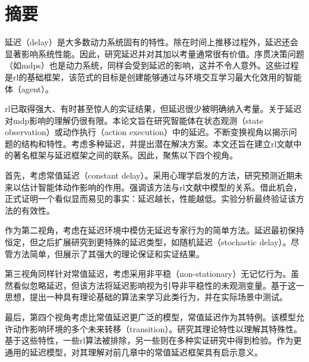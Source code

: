 \chapter*{摘要}

延迟（delay）是大多数动力系统固有的特性。除在时间上推移过程外，延迟还会显著影响系统性能。因此，研究延迟并对其加以考量通常很有价值。序贯决策问题（如\glspl{mdp}）也是动力系统，同样会受到延迟的影响，这并不令人意外。这些过程是\gls{rl}的基础框架，该范式的目标是创建能够通过与环境交互学习最大化效用的智能体（agent）。

\gls{rl}已取得强大、有时甚至惊人的实证结果，但延迟很少被明确纳入考量。关于延迟对\gls{mdp}影响的理解仍很有限。本论文旨在研究智能体在状态观测（state observation）或动作执行（action execution）中的延迟。不断变换视角以揭示问题的结构和特性。考虑多种延迟，并提出潜在解决方案。本文还旨在建立\gls{rl}文献中的著名框架与延迟框架之间的联系。因此，聚焦以下四个视角。

首先，考虑常值延迟（constant delay）。采用心理学启发的方法，研究预测近期未来以估计智能体动作影响的作用。强调该方法与\gls{rl}文献中模型的关系。借此机会，正式证明一个看似显而易见的事实：延迟越长，性能越低。实验分析最终验证该方法的有效性。

作为第二视角，考虑在延迟环境中模仿无延迟专家行为的简单方法。延迟最初保持恒定，但之后扩展研究到更特殊的延迟类型，如随机延迟（stochastic delay）。尽管方法简单，但展示了其强大的理论保证和实证结果。

第三视角同样针对常值延迟，考虑采用非平稳（non-stationary）无记忆行为。虽然看似忽略延迟，但该方法将延迟影响视为引导非平稳性的未观测变量。基于这一思想，提出一种具有理论基础的算法来学习此类行为，并在实际场景中测试。

最后，第四个视角考虑比常值延迟更广泛的模型，常值延迟作为其特例。该模型允许动作影响环境的多个未来转移（transition）。研究其理论特性以理解其特殊性。基于这些特性，一些\gls{rl}算法被排除，另一些则在多种实证研究中得到检验。作为更通用的延迟模型，对其理解对前几章中的常值延迟框架具有启示意义。
